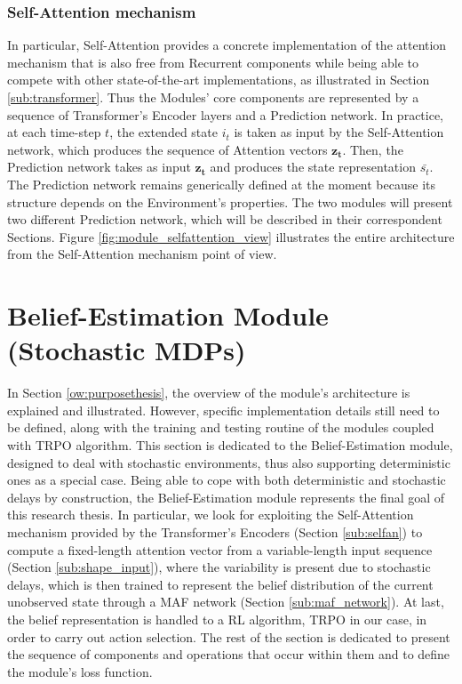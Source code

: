             \subsubsection{Self-Attention mechanism}
                In particular, Self-Attention provides a concrete implementation of the attention mechanism that is also free from Recurrent components while being able to compete with other state-of-the-art implementations, as illustrated in Section \ref{sub:transformer}. Thus the Modules' core components are represented by a sequence of Transformer's Encoder layers and a Prediction network. In practice, at each time-step $t$, the extended state $i_t$ is taken as input by the Self-Attention network, which produces the sequence of Attention vectors $\mathbf{z_t}$. Then, the Prediction network takes as input $\mathbf{z_t}$ and produces the state representation $\bar{s_t}$. The Prediction network remains generically defined at the moment because its structure depends on the Environment's properties. The two modules will present two different Prediction network, which will be described in their correspondent Sections. Figure \ref{fig:module_selfattention_view} illustrates the entire architecture from the Self-Attention mechanism point of view.
                
    
    \newpage
    \section{Belief-Estimation Module (Stochastic MDPs)}
        \label{ow:beliefmodule}
        In Section \ref{ow:purposethesis}, the overview of the module’s architecture is explained and illustrated. However, specific implementation details still need to be defined, along with the training and testing routine of the modules coupled with TRPO algorithm. \newline
        This section is dedicated to the Belief-Estimation module, designed to deal with stochastic environments, thus also supporting deterministic ones as a special case. Being able to cope with both deterministic and stochastic delays by construction, the Belief-Estimation module represents the final goal of this research thesis. In particular, we look for exploiting the Self-Attention mechanism provided by the Transformer's Encoders (Section \ref{sub:selfan}) to compute a fixed-length attention vector from a variable-length input sequence (Section \ref{sub:shape_input}), where the variability is present due to stochastic delays, which is then trained to represent the belief distribution of the current unobserved state through a MAF network (Section \ref{sub:maf_network}). At last, the belief representation is handled to a RL algorithm, TRPO in our case, in order to carry out action selection. The rest of the section is dedicated to present the sequence of components and operations that occur within them and to define the module's loss function.
        
